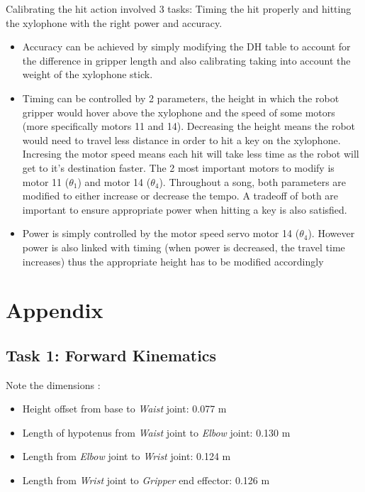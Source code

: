 \documentclass[9pt, a4paper]{article}
\begin{document}
\begin{enumerate}
  Calibrating the hit action involved 3 tasks: Timing the hit properly and
  hitting the xylophone with the right power and accuracy. 
  \begin{itemize}
    \item Accuracy can be achieved by simply modifying the DH table to account
    for the difference in gripper length and also calibrating taking into
    account the weight of the xylophone stick. 
    \item Timing can be controlled by 2 parameters, the height in which the
    robot gripper would hover above the xylophone and the speed of some motors
    (more specifically motors 11 and 14). Decreasing the height means the robot
    would need to travel less distance in order to hit a key on the xylophone.
    Incresing the motor speed means each hit will take less time as the robot
    will get to it's destination faster. The 2 most important motors to modify
    is motor 11 ($\theta_1$) and motor 14 ($\theta_4$). Throughout a song, both
    parameters are modified to either increase or decrease the tempo. A tradeoff
    of both are important to ensure appropriate power when hitting a key is also
    satisfied. 
    \item Power is simply controlled by the motor speed servo motor 14 ($\theta_4$).
    However power is also linked with timing (when power is decreased, the travel
    time increases) thus the appropriate height has to be modified accordingly 
  \end{itemize}
\end{enumerate}

\pagebreak
\section{Appendix}
\subsection{Task 1: Forward Kinematics}

Note the dimensions \cite{CAD_model}: 
\begin{itemize}
  \item Height offset from base to \textit{Waist} joint: 0.077 m
  \item Length of hypotenus from \textit{Waist} joint to \textit{Elbow} joint:
  0.130 m 
  \item Length from \textit{Elbow} joint to \textit{Wrist} joint: 0.124 m 
  \item Length from \textit{Wrist} joint to \textit{Gripper} end effector: 0.126 m
\end{itemize}
\end{document}
